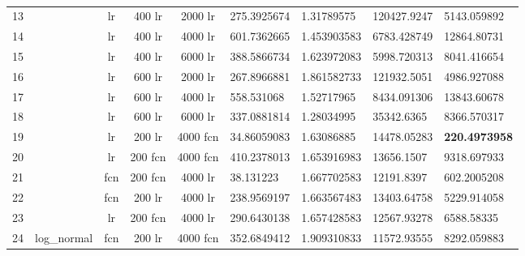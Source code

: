 \begin{landscape}
\begin{table}[]
\begin{tabular}{|c|c|c|c|c|l|l|l|l|}
\multicolumn{1}{|l|}{13} &  & lr & 400 lr & 2000 lr & 275.3925674 & 1.31789575 & 120427.9247 & 5143.059892 \\ \cline{1-1} \cline{3-9} 
\multicolumn{1}{|l|}{14} &  & lr & 400 lr & 4000 lr & 601.7362665 & 1.453903583 & 6783.428749 & 12864.80731 \\ \cline{1-1} \cline{3-9} 
\multicolumn{1}{|l|}{15} &  & lr & 400 lr & 6000 lr & 388.5866734 & 1.623972083 & 5998.720313 & 8041.416654 \\ \cline{1-1} \cline{3-9} 
\multicolumn{1}{|l|}{16} &  & lr & 600 lr & 2000 lr & 267.8966881 & 1.861582733 & 121932.5051 & 4986.927088 \\ \cline{1-1} \cline{3-9} 
\multicolumn{1}{|l|}{17} &  & lr & 600 lr & 4000 lr & 558.531068 & 1.52717965 & 8434.091306 & 13843.60678 \\ \cline{1-1} \cline{3-9} 
\multicolumn{1}{|l|}{18} &  & lr & 600 lr & 6000 lr & 337.0881814 & 1.28034995 & 35342.6365 & 8366.570317 \\ \cline{1-1} \cline{3-9} 
\multicolumn{1}{|l|}{19} &  & lr & 200 lr & 4000 fcn & 34.86059083 & 1.63086885 & 14478.05283 & \textbf{220.4973958} \\ \cline{1-1} \cline{3-9} 
\multicolumn{1}{|l|}{20} &  & lr & 200 fcn & 4000 fcn & 410.2378013 & 1.653916983 & 13656.1507 & 9318.697933 \\ \cline{1-1} \cline{3-9} 
\multicolumn{1}{|l|}{21} &  & fcn & 200 fcn & 4000 lr & 38.131223 & 1.667702583 & 12191.8397 & 602.2005208 \\ \cline{1-1} \cline{3-9} 
\multicolumn{1}{|l|}{22} &  & fcn & 200 lr & 4000 lr & 238.9569197 & 1.663567483 & 13403.64758 & 5229.914058 \\ \cline{1-1} \cline{3-9} 
\multicolumn{1}{|l|}{23} &  & lr & 200 fcn & 4000 lr & 290.6430138 & 1.657428583 & 12567.93278 & 6588.58335 \\ \cline{1-1} \cline{3-9} 
\multicolumn{1}{|l|}{24} & \multirow{-24}{*}{log\_normal} & fcn & 200 lr & 4000 fcn & 352.6849412 & 1.909310833 & 11572.93555 & 8292.059883 \\ \hline
\end{tabular}
\label{appendix_1: experiments summary of small lognormal}
\caption{}
\end{table}
\end{landscape}
\endgroup
